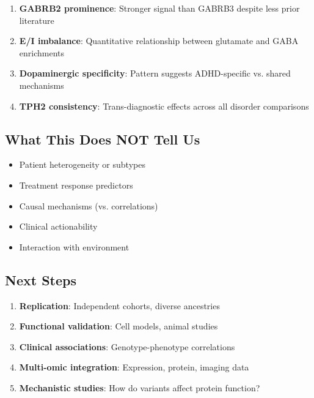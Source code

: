 \documentclass[12pt,letterpaper]{article}
\begin{document}
\begin{enumerate}
    \item \textbf{GABRB2 prominence}: Stronger signal than GABRB3 despite less prior literature
    \item \textbf{E/I imbalance}: Quantitative relationship between glutamate and GABA enrichments
    \item \textbf{Dopaminergic specificity}: Pattern suggests ADHD-specific vs. shared mechanisms
    \item \textbf{TPH2 consistency}: Trans-diagnostic effects across all disorder comparisons
\end{enumerate}

\subsection{What This Does NOT Tell Us}

\begin{itemize}
    \item Patient heterogeneity or subtypes
    \item Treatment response predictors
    \item Causal mechanisms (vs. correlations)
    \item Clinical actionability
    \item Interaction with environment
\end{itemize}

\subsection{Next Steps}

\begin{enumerate}
    \item \textbf{Replication}: Independent cohorts, diverse ancestries
    \item \textbf{Functional validation}: Cell models, animal studies
    \item \textbf{Clinical associations}: Genotype-phenotype correlations
    \item \textbf{Multi-omic integration}: Expression, protein, imaging data
    \item \textbf{Mechanistic studies}: How do variants affect protein function?
\end{enumerate}
\end{document}
